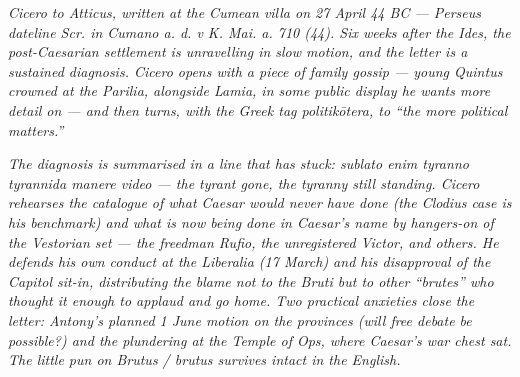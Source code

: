 
\textit{Cicero to Atticus, written at the Cumean villa on 27
April 44 BC --- Perseus dateline \textit{Scr. in Cumano a. d. v
K. Mai. a. 710 (44)}. Six weeks after the Ides, the post-Caesarian
settlement is unravelling in slow motion, and the letter is a
sustained diagnosis. Cicero opens with a piece of family gossip
--- young Quintus crowned at the Parilia, alongside Lamia, in some
public display he wants more detail on --- and then turns, with the
Greek tag \textit{politik\=otera}, to ``the more political
matters.''}

\textit{The diagnosis is summarised in a line that has stuck:
\textit{sublato enim tyranno tyrannida manere video} --- the
tyrant gone, the tyranny still standing. Cicero rehearses the
catalogue of what Caesar would never have done (the Clodius case
is his benchmark) and what is now being done in Caesar's name by
hangers-on of the Vestorian set --- the freedman Rufio, the
unregistered Victor, and others. He defends his own conduct at
the Liberalia (17 March) and his disapproval of the Capitol
sit-in, distributing the blame not to the Bruti but to other
``brutes'' who thought it enough to applaud and go home. Two
practical anxieties close the letter: Antony's planned 1 June
motion on the provinces (will free debate be possible?) and the
plundering at the Temple of Ops, where Caesar's war chest sat.
The little pun on \textit{Brutus / brutus} survives intact in the
English.}
